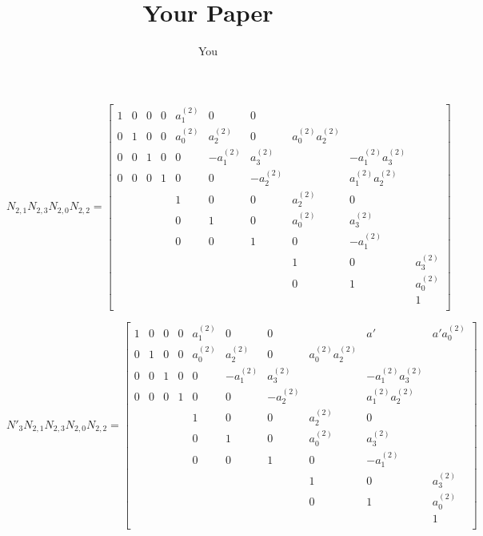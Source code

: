 \documentclass{article}
\title{Your Paper}
\author{You}
\begin{document}
\maketitle
\[
N_{2,1}N_{2,3}N_{2,0}N_{2,2}=
  \begin{bmatrix}
    1 & 0 & 0 & 0 & a_1^{(2)} & 0 & 0 &  &  &  \\
    0 & 1 & 0 & 0 & a_0^{(2)} & a_2^{(2)} & 0 & a_0^{(2)}a_2^{(2)} &  &  \\
    0 & 0 & 1 & 0 & 0 & -a_1^{(2)} & a_3^{(2)} &  & -a_1^{(2)}a_3^{(2)} &  \\
    0 & 0 & 0 & 1 & 0 & 0 & -a_2^{(2)} &  & a_1^{(2)}a_2^{(2)} &  \\
    & & & & 1 & 0 & 0 & a_2^{(2)} & 0 &  \\
    & & & & 0 & 1 & 0 & a_0^{(2)} & a_3^{(2)} & \\
    & & & & 0 & 0 & 1 & 0 & -a_1^{(2)} &  \\
    & & & & & & & 1 & 0 & a_3^{(2)} \\
    & & & & & & & 0 & 1 & a_0^{(2)} \\
    & & & & & & & & & 1 \\
  \end{bmatrix}
\]


\[
N'_3N_{2,1}N_{2,3}N_{2,0}N_{2,2}=
  \begin{bmatrix}
    1 & 0 & 0 & 0 & a_1^{(2)} & 0 & 0 &  & a' & a'a_0^{(2)} \\
    0 & 1 & 0 & 0 & a_0^{(2)} & a_2^{(2)} & 0 & a_0^{(2)}a_2^{(2)} &  &  \\
    0 & 0 & 1 & 0 & 0 & -a_1^{(2)} & a_3^{(2)} &  & -a_1^{(2)}a_3^{(2)} &  \\
    0 & 0 & 0 & 1 & 0 & 0 & -a_2^{(2)} &  & a_1^{(2)}a_2^{(2)} &  \\
    & & & & 1 & 0 & 0 & a_2^{(2)} & 0 &  \\
    & & & & 0 & 1 & 0 & a_0^{(2)} & a_3^{(2)} & \\
    & & & & 0 & 0 & 1 & 0 & -a_1^{(2)} &  \\
    & & & & & & & 1 & 0 & a_3^{(2)} \\
    & & & & & & & 0 & 1 & a_0^{(2)} \\
    & & & & & & & & & 1 \\
  \end{bmatrix}
\]
\end{document}
